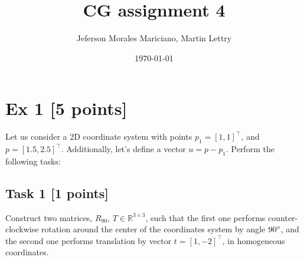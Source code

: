 \documentclass{article}
\title{CG assignment 4}
\author{Jeferson Morales Mariciano, Martin Lettry}
\date{\today}
\begin{document}
\maketitle

\section*{Ex 1 [5 points]}
Let us consider a 2D coordinate system with points $p_1 = [1, 1]^\intercal$,
and $p = [1.5, 2.5]^\intercal$.
Additionally, let's define a vector $u = p - p_1$.
Perform the following tasks:

\subsection*{Task 1 [1 points]}
Construct two matrices, $R_{90}$, $T \in \mathbb{R}^{3 \times 3}$,
such that the first one performs counter-clockwise rotation around
the center of the coordinates system by angle $90 \degree$, and the second one performs translation
by vector $t = [1, -2]^\intercal$, in homogeneous coordinates.
\end{document}
